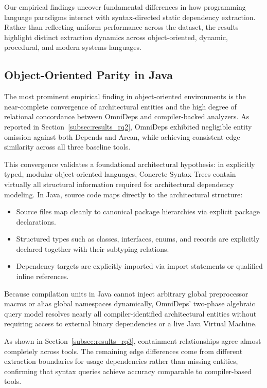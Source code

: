 Our empirical findings uncover fundamental differences in how programming
language paradigms interact with syntax-directed static dependency extraction.
Rather than reflecting uniform performance across the dataset, the results
highlight distinct extraction dynamics across object-oriented, dynamic,
procedural, and modern systems languages.

\subsection{Object-Oriented Parity in Java}
\label{subsec:discussion_oo_parity}

The most prominent empirical finding in object-oriented environments is the
near-complete convergence of architectural entities and the high degree of
relational concordance between OmniDeps and compiler-backed analyzers. As
reported in Section~\ref{subsec:results_rq2}, OmniDeps exhibited negligible
entity omission against both Depends and Arcan, while achieving consistent
edge similarity across all three baseline tools.

This convergence validates a foundational architectural hypothesis: in
explicitly typed, modular object-oriented languages, Concrete Syntax Trees
contain virtually all structural information required for architectural
dependency modeling. In Java, source code maps directly to the
architectural structure:
\begin{itemize}[noitemsep]
  \item Source files map cleanly to canonical package hierarchies via explicit
    package declarations.
  \item Structured types such as classes, interfaces, enums, and records are
    explicitly declared together with their subtyping relations.
  \item Dependency targets are explicitly imported via import statements or
    qualified inline references.
\end{itemize}

Because compilation units in Java cannot inject arbitrary global preprocessor
macros or alias global namespaces dynamically, OmniDeps' two-phase algebraic
query model resolves nearly all compiler-identified architectural entities
without requiring access to external binary dependencies or a live Java Virtual
Machine.

As shown in Section~\ref{subsec:results_rq3}, containment relationships agree
almost completely across tools. The remaining edge differences come from
different extraction boundaries for usage dependencies rather than missing
entities, confirming that syntax queries achieve accuracy comparable to
compiler-based tools.

